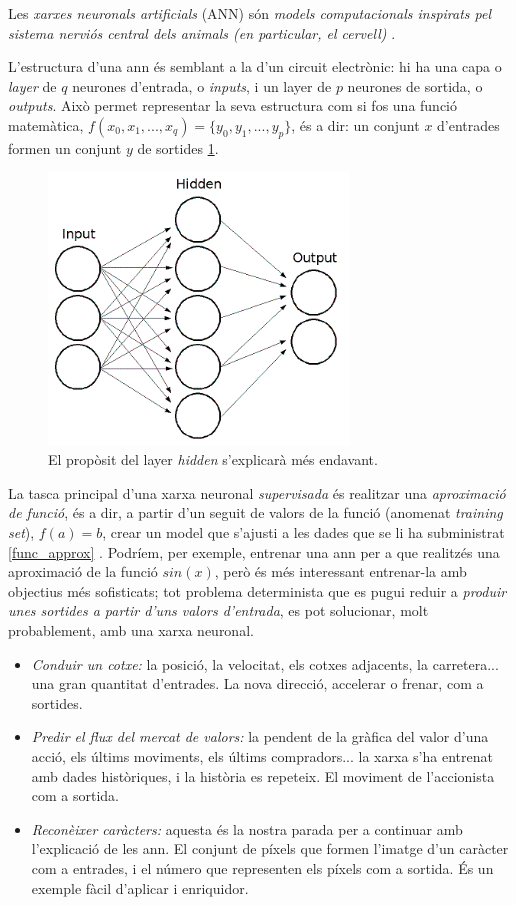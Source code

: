 Les \emph{xarxes neuronals artificials} (ANN) són \emph{models computacionals 
inspirats pel sistema nerviós central dels animals (en particular, el cervell)} \autocite{nnpatrec}.

L'estructura d'una \ac{ann} és semblant a la d'un circuit electrònic: hi ha una capa o \emph{layer}
de $ q $ neurones d'entrada, o \emph{inputs}, i un layer de $ p $ neurones de sortida, o \emph{outputs}.
Això permet representar la seva estructura com si fos una funció matemàtica, $ f(x_0, x_1, ..., x_q) = \{y_0, y_1, ..., y_p\} $,
és a dir: un conjunt $ x $ d'entrades formen un conjunt $ y $ de sortides \ref{simple_ann}.

\begin{figure}[ht!]
\centering
\includegraphics[width=80mm]{data/nn_simple.png}
\caption{El propòsit del layer \emph{hidden} s'explicarà més endavant.}
\label{simple_ann}
\end{figure}

La tasca principal d'una xarxa neuronal \emph{supervisada} és realitzar una \emph{aproximació de funció},
és a dir, a partir d'un seguit de valors de la funció (anomenat \emph{training set}), $ f(a) = b $, crear un model que s'ajusti a les dades
que se li ha subministrat \ref{func_approx} \autocite{msccsanad}. Podríem, per exemple, entrenar una \ac{ann} per a que realitzés
una aproximació de la funció $ sin(x)$, però és més interessant entrenar-la amb objectius més sofisticats; tot
problema determinista que es pugui reduir a \emph{produir unes sortides a partir d'uns valors d'entrada}, es pot
solucionar, molt probablement, amb una xarxa neuronal.

\begin{itemize}
\item \emph{Conduir un cotxe:} la posició, la velocitat, els cotxes adjacents, la carretera... una gran quantitat d'entrades. La nova direcció, 
accelerar o frenar, com a sortides.
\item \emph{Predir el flux del mercat de valors:} la pendent de la gràfica del valor d'una acció, els últims moviments, els últims compradors...
la xarxa s'ha entrenat amb dades històriques, i la història es repeteix. El moviment de l'accionista com a sortida.
\item \emph{Reconèixer caràcters:} aquesta és la nostra parada per a continuar amb l'explicació de les \ac{ann}. El conjunt de píxels que formen 
l'imatge d'un caràcter com a entrades, i el número que representen els píxels com a sortida. És un exemple fàcil d'aplicar i enriquidor.
\end{itemize}

